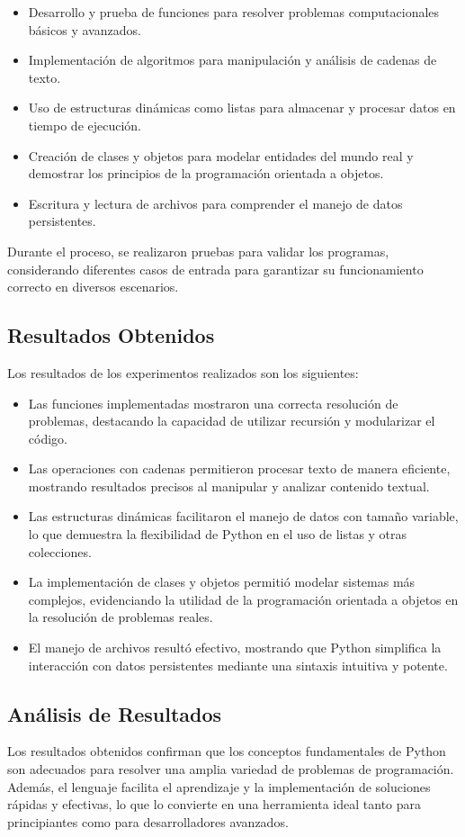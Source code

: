 \documentclass[conference]{IEEEtran}
\begin{document}
\begin{itemize}
    \item Desarrollo y prueba de funciones para resolver problemas computacionales básicos y avanzados.
    \item Implementación de algoritmos para manipulación y análisis de cadenas de texto.
    \item Uso de estructuras dinámicas como listas para almacenar y procesar datos en tiempo de ejecución.
    \item Creación de clases y objetos para modelar entidades del mundo real y demostrar los principios de la programación orientada a objetos.
    \item Escritura y lectura de archivos para comprender el manejo de datos persistentes.
\end{itemize}

Durante el proceso, se realizaron pruebas para validar los programas, considerando diferentes casos de entrada para garantizar su funcionamiento correcto en diversos escenarios.

\subsection{Resultados Obtenidos}
Los resultados de los experimentos realizados son los siguientes:

\begin{itemize}
    \item Las funciones implementadas mostraron una correcta resolución de problemas, destacando la capacidad de utilizar recursión y modularizar el código.
    \item Las operaciones con cadenas permitieron procesar texto de manera eficiente, mostrando resultados precisos al manipular y analizar contenido textual.
    \item Las estructuras dinámicas facilitaron el manejo de datos con tamaño variable, lo que demuestra la flexibilidad de Python en el uso de listas y otras colecciones.
    \item La implementación de clases y objetos permitió modelar sistemas más complejos, evidenciando la utilidad de la programación orientada a objetos en la resolución de problemas reales.
    \item El manejo de archivos resultó efectivo, mostrando que Python simplifica la interacción con datos persistentes mediante una sintaxis intuitiva y potente.
\end{itemize}

\subsection{Análisis de Resultados}
Los resultados obtenidos confirman que los conceptos fundamentales de Python son adecuados para resolver una amplia variedad de problemas de programación. Además, el lenguaje facilita el aprendizaje y la implementación de soluciones rápidas y efectivas, lo que lo convierte en una herramienta ideal tanto para principiantes como para desarrolladores avanzados.
\end{document}
